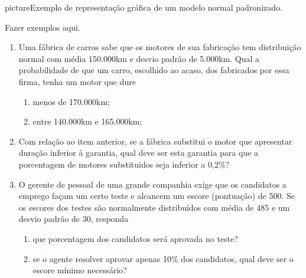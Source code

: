 \documentclass[11pt,fleqn]{book}
\numberwithin{mpicture}{chapter}
\numberwithin{mtable}{chapter}
\numberwithin{mframe}{chapter}
\begin{document}
\begin{sidepicture}{4cm}{picture}{Exemplo de representação gráfica de um modelo normal padronizado.}
	\label{fig:cap0:modelo_normal_padronizada}
\end{sidepicture}

{\color{red}Fazer exemplos aqui.}

\newpage\nosidepicturearea
\begin{exercise}\hfill
	\begin{multicols}{2}
	\begin{enumerate}[label=\textbf{\color{ocre}\arabic*.}, itemsep=20pt]
		\item Uma fábrica de carros sabe que os motores de sua fabricação tem distribuição normal com média 150.000km e desvio padrão de 5.000km. Qual a probabilidade de que um carro, escolhido ao acaso, dos fabricados por essa firma, tenha um motor que dure	
			\begin{enumerate}[label=\textbf{\color{ocre}(\alph*)}]
				\item menos de 170.000km;
				\item entre 140.000km e 165.000km;
			\end{enumerate}
			
		\item Com relação ao item anterior, se a fábrica substitui o motor que apresentar duração inferior à garantia, qual deve ser esta garantia para que a porcentagem de motores substituidos seja inferior a 0,2\%?
		
		\item O gerente de pessoal de uma grande companhia exige que os candidatos a emprego façam um certo teste e alcancem um escore (pontuação) de 500. Se os escores dos testes são normalmente distribuídos com média de 485 e um desvio padrão de 30, responda
			\begin{enumerate}[label=\textbf{\color{ocre}(\alph*)}]
				\item que porcentagem dos candidatos será aprovada no teste?
				\item se o agente resolver aprovar apenas 10\% dos candidatos, qual deve ser o escore mínimo necessário?
			\end{enumerate}
			

\end{enumerate}
\end{multicols}
\end{exercise}
\end{document}
